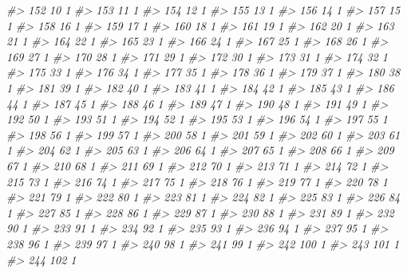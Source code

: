 \documentclass[]{article}
\newenvironment{Shaded}{\begin{snugshade}}{\end{snugshade}}
\newcommand{\CommentTok}[1]{\textcolor[rgb]{0.56,0.35,0.01}{\textit{#1}}}
\begin{document}
\begin{Shaded}
\begin{Highlighting}[]
\CommentTok{#> 152   10  1}
\CommentTok{#> 153   11  1}
\CommentTok{#> 154   12  1}
\CommentTok{#> 155   13  1}
\CommentTok{#> 156   14  1}
\CommentTok{#> 157   15  1}
\CommentTok{#> 158   16  1}
\CommentTok{#> 159   17  1}
\CommentTok{#> 160   18  1}
\CommentTok{#> 161   19  1}
\CommentTok{#> 162   20  1}
\CommentTok{#> 163   21  1}
\CommentTok{#> 164   22  1}
\CommentTok{#> 165   23  1}
\CommentTok{#> 166   24  1}
\CommentTok{#> 167   25  1}
\CommentTok{#> 168   26  1}
\CommentTok{#> 169   27  1}
\CommentTok{#> 170   28  1}
\CommentTok{#> 171   29  1}
\CommentTok{#> 172   30  1}
\CommentTok{#> 173   31  1}
\CommentTok{#> 174   32  1}
\CommentTok{#> 175   33  1}
\CommentTok{#> 176   34  1}
\CommentTok{#> 177   35  1}
\CommentTok{#> 178   36  1}
\CommentTok{#> 179   37  1}
\CommentTok{#> 180   38  1}
\CommentTok{#> 181   39  1}
\CommentTok{#> 182   40  1}
\CommentTok{#> 183   41  1}
\CommentTok{#> 184   42  1}
\CommentTok{#> 185   43  1}
\CommentTok{#> 186   44  1}
\CommentTok{#> 187   45  1}
\CommentTok{#> 188   46  1}
\CommentTok{#> 189   47  1}
\CommentTok{#> 190   48  1}
\CommentTok{#> 191   49  1}
\CommentTok{#> 192   50  1}
\CommentTok{#> 193   51  1}
\CommentTok{#> 194   52  1}
\CommentTok{#> 195   53  1}
\CommentTok{#> 196   54  1}
\CommentTok{#> 197   55  1}
\CommentTok{#> 198   56  1}
\CommentTok{#> 199   57  1}
\CommentTok{#> 200   58  1}
\CommentTok{#> 201   59  1}
\CommentTok{#> 202   60  1}
\CommentTok{#> 203   61  1}
\CommentTok{#> 204   62  1}
\CommentTok{#> 205   63  1}
\CommentTok{#> 206   64  1}
\CommentTok{#> 207   65  1}
\CommentTok{#> 208   66  1}
\CommentTok{#> 209   67  1}
\CommentTok{#> 210   68  1}
\CommentTok{#> 211   69  1}
\CommentTok{#> 212   70  1}
\CommentTok{#> 213   71  1}
\CommentTok{#> 214   72  1}
\CommentTok{#> 215   73  1}
\CommentTok{#> 216   74  1}
\CommentTok{#> 217   75  1}
\CommentTok{#> 218   76  1}
\CommentTok{#> 219   77  1}
\CommentTok{#> 220   78  1}
\CommentTok{#> 221   79  1}
\CommentTok{#> 222   80  1}
\CommentTok{#> 223   81  1}
\CommentTok{#> 224   82  1}
\CommentTok{#> 225   83  1}
\CommentTok{#> 226   84  1}
\CommentTok{#> 227   85  1}
\CommentTok{#> 228   86  1}
\CommentTok{#> 229   87  1}
\CommentTok{#> 230   88  1}
\CommentTok{#> 231   89  1}
\CommentTok{#> 232   90  1}
\CommentTok{#> 233   91  1}
\CommentTok{#> 234   92  1}
\CommentTok{#> 235   93  1}
\CommentTok{#> 236   94  1}
\CommentTok{#> 237   95  1}
\CommentTok{#> 238   96  1}
\CommentTok{#> 239   97  1}
\CommentTok{#> 240   98  1}
\CommentTok{#> 241   99  1}
\CommentTok{#> 242  100  1}
\CommentTok{#> 243  101  1}
\CommentTok{#> 244  102  1}

\end{Highlighting}
\end{Shaded}
\end{document}
